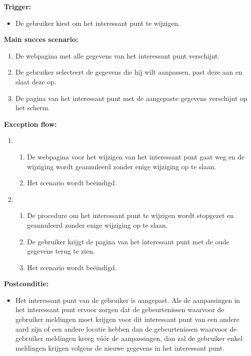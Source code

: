 \documentclass[11pt,twoside,a4paper]{article}
\newcommand{\subpunt}[1]{
	\noindent
	\textbf{\small{#1}}
}
\newenvironment{trigger}{
	\subpunt{Trigger:}
	\begin{itemize}[label={}]
}{
	\end{itemize}
}
\newenvironment{mainss}{
	\subpunt{Main succes scenario:}
	\begin{enumerate}
}{
	\end{enumerate}
}
\newenvironment{except}{
	\subpunt{Exception flow:}
	\begin{enumerate}
}{
	\end{enumerate}
}
\newenvironment{postcond}{
	\subpunt{Postconditie:}
	\begin{itemize}[label={}]
}{
	\end{itemize}
}
\newcommand{\flowidx}{0}
\newcounter{nstap}
\newcommand{\flowtitle}[1]{					%
	\setcounter{nstap}{0}
	\item[\flowidx.][\emph{#1}]
}
\newcommand{\flowstap}{ 					%
	\stepcounter{nstap}
	\item[\flowidx.\arabic{nstap}]
}
\newenvironment{flow}[2]{					
	\renewcommand{\flowidx}{#1}
	
	\flowtitle{#2}
	\begin{enumerate}
}{
	\end{enumerate}
}
\begin{document}
	\begin{trigger}
		\item De gebruiker kiest om het interessant punt te wijzigen.
	\end{trigger}
	
	\begin{mainss}
		\item De webpagina met alle gegevens van het interessant punt verschijnt.
		\item De gebruiker selecteert de gegevens die hij wilt aanpassen, past deze aan en slaat deze op.\label{chge_poi_save}
		\item De pagina van het interessant punt met de aangepaste gegevens verschijnt op het scherm.\label{chge_poi_end}
	\end{mainss}
	
	\begin{except}
		\begin{flow}{\ref{chge_poi_save} - \ref{chge_poi_end}}{De gebruiker verlaat de webpagina en/of gaat naar een andere webpagina.}
			\flowstap De webpagina voor het wijzigen van het interessant punt gaat weg en de wijziging wordt geannuleerd zonder enige wijziging op te slaan.
			\flowstap Het scenario wordt be\"eindigd.
		\end{flow}
		
		\begin{flow}{\ref{chge_poi_save} - \ref{chge_poi_end}}{De gebruiker annuleert zijn wijzigingen.} 
			\flowstap De procedure om het interessant punt te wijzigen wordt stopgezet en geannuleerd zonder enige wijziging op te slaan.
			\flowstap De gebruiker krijgt de pagina van het interessant punt met de oude gegevens terug te zien.
			\flowstap Het scenario wordt be\"eindigd.
		\end{flow}
	\end{except}
	
	\begin{postcond}
		\item Het interessant punt van de gebruiker is aangepast. Als de aanpassingen in het interessant punt ervoor zorgen dat de gebeurtenissen waarvoor de gebruiker meldingen moet krijgen voor dit interessant punt van een andere aard zijn of een andere locatie hebben dan de gebeurtenissen waarvoor de gebruiker meldingen kreeg v\'o\'or de aanpassingen, dan zal de gebruiker enkel meldingen krijgen volgens de nieuwe gegevens in het interessant punt.
	\end{postcond}
	
	
\end{document}
